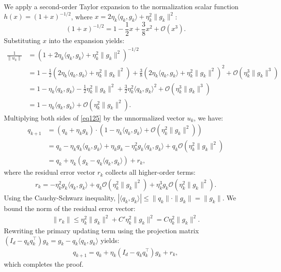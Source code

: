 \documentclass[11pt,a4paper]{article}
\theoremstyle{definition}
\begin{document}
We apply a second-order Taylor expansion to the normalization scalar function $h(x) = (1+x)^{-1/2}$, where $x = 2 \eta_k \langle q_k, g_k \rangle + \eta_k^2 \|g_k\|^2$:
\begin{equation}
(1+x)^{-1/2} = 1 - \frac{1}{2}x + \frac{3}{8}x^2 + \mathcal{O}(x^3). 
\end{equation}
Substituting $x$ into the expansion yields:
\begin{align}
\frac{1}{\|u_k\|} &= \left( 1 + 2 \eta_k \langle q_k, g_k \rangle + \eta_k^2 \|g_k\|^2 \right)^{-1/2} \nonumber\\
&= 1 - \frac{1}{2}\left( 2 \eta_k \langle q_k, g_k \rangle + \eta_k^2 \|g_k\|^2 \right) + \frac{3}{8}\left( 2 \eta_k \langle q_k, g_k \rangle + \eta_k^2 \|g_k\|^2 \right)^2 + \mathcal{O}(\eta_k^3 \|g_k\|^3) \nonumber\\
&= 1 - \eta_k \langle q_k, g_k\rangle - \frac{1}{2}\eta_k^2 \|g_k\|^2 + \frac{3}{2}\eta_k^2 \langle q_k, g_k \rangle^2 + \mathcal{O}(\eta_k^3 \|g_k\|^3) \nonumber\\
&= 1 - \eta_k \langle q_k, g_k \rangle + \mathcal{O}(\eta_k^2 \|g_k\|^2) \label{eq125}.
\end{align}
Multiplying both sides of \eqref{eq125} by the unnormalized vector $u_k$, we have:
\begin{align}
q_{k+1} &= (q_k + \eta_k g_k) \cdot \left( 1 - \eta_k \langle q_k, g_k \rangle + \mathcal{O}(\eta_k^2 \|g_k\|^2) \right) \nonumber\\
&= q_k- \eta_k q_k \langle q_k, g_k \rangle + \eta_k g_k - \eta_k^2 g_k \langle q_k, g_k \rangle + q_k \mathcal{O}(\eta_k^2 \|g_k\|^2) \nonumber\\
&= q_k + \eta_k \left( g_k - q_k \langle q_k, g_k\rangle \right) + r_k,
\end{align}
where the residual error vector $r_k$ collects all higher-order terms:
\begin{align}
r_k = -\eta_k^2 g_k \langle q_k, g_k \rangle + q_k \mathcal{O}(\eta_k^2 \|g_k\|^2) + \eta_k^3 g_k \mathcal{O}(\eta_k^2 \|g_k\|^2).
\end{align}
Using the Cauchy-Schwarz inequality, $|\langle q_k, g_k \rangle| \le \|q_k\| \cdot \|g_k\| = \|g_k\|$. We bound the norm of the residual error vector:
\begin{align}
\|r_k\| \le \eta_k^2 \|g_k\|^2 + C' \eta_k^2 \|g_k\|^2 = C \eta_k^2 \|g_k\|^2. 
\end{align}
Rewriting the primary updating term using the projection matrix $(I_d - q_k q_k^\top)g_k = g_k - q_k \langle q_k, g_k \rangle$ yields:
\begin{align}
q_{k+1} = q_k + \eta_k (I_d - q_k q_k^\top)g_k + r_k,
\end{align}
which completes the proof.
\end{document}
